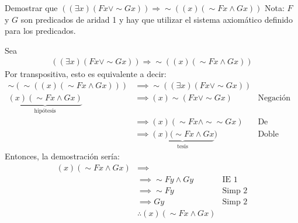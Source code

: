 \begin{problema}
    Demostrar que $((\exists x)(F x \vee \sim G x)) \Longrightarrow \sim((x)(\sim F x \wedge G x))$
Nota: $F$ y $G$ son predicados de aridad 1 y hay que utilizar el sistema axiomático definido para los predicados.
\begin{dem}
    Sea 
    \begin{align*}
        ((\exists x)(F x \vee \sim G x)) \Longrightarrow \sim((x)(\sim F x \wedge G x))
    \end{align*}
    Por transpositiva, esto es equivalente a decir: 
    \begin{align*}
        \sim (\sim((x)(\sim F x \wedge G x))) &\implies \sim ((\exists x)(F x \vee \sim G x)) & \\
        \underbrace{(x)(\sim F x \wedge G x)}_{\text{hipótesis}}&\implies (x)\sim(Fx\vee \sim Gx) & \text{Negación}\\
        &\implies (x)(\sim Fx\wedge \sim\sim Gx) & \text{De Morgan}\\
        &\implies \underbrace{(x)(\sim Fx\wedge Gx}_{\text{tesis}}) & \text{Doble negación}
    \end{align*}
    Entonces, la demostración sería: 
    \begin{align*}
        (x)(\sim F x \wedge G x)&\implies&\\
        &\implies \sim Fy\wedge Gy& \text{IE 1}\\
        &\implies \sim Fy& \text{Simp 2}\\
        &\implies Gy& \text{Simp 2}\\
        &\therefore(x)(\sim F x \wedge G x)
    \end{align*}
\end{dem}
\end{problema}

